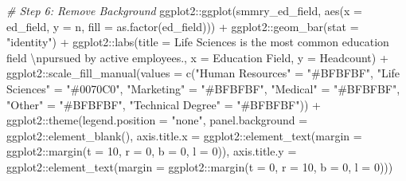 \documentclass[
]{book}
\newenvironment{Shaded}{\begin{snugshade}}{\end{snugshade}}
\newcommand{\AttributeTok}[1]{\textcolor[rgb]{0.77,0.63,0.00}{#1}}
\newcommand{\CommentTok}[1]{\textcolor[rgb]{0.56,0.35,0.01}{\textit{#1}}}
\newcommand{\DecValTok}[1]{\textcolor[rgb]{0.00,0.00,0.81}{#1}}
\newcommand{\FunctionTok}[1]{\textcolor[rgb]{0.00,0.00,0.00}{#1}}
\newcommand{\NormalTok}[1]{#1}
\newcommand{\OtherTok}[1]{\textcolor[rgb]{0.56,0.35,0.01}{#1}}
\newcommand{\SpecialCharTok}[1]{\textcolor[rgb]{0.00,0.00,0.00}{#1}}
\newcommand{\StringTok}[1]{\textcolor[rgb]{0.31,0.60,0.02}{#1}}
\begin{document}
\begin{Shaded}
\begin{Highlighting}[]
\CommentTok{\# Step 6: Remove Background}
\NormalTok{ggplot2}\SpecialCharTok{::}\FunctionTok{ggplot}\NormalTok{(smmry\_ed\_field, }\FunctionTok{aes}\NormalTok{(}\AttributeTok{x =}\NormalTok{ ed\_field, }\AttributeTok{y =}\NormalTok{ n, }\AttributeTok{fill =} \FunctionTok{as.factor}\NormalTok{(ed\_field))) }\SpecialCharTok{+}
\NormalTok{ggplot2}\SpecialCharTok{::}\FunctionTok{geom\_bar}\NormalTok{(}\AttributeTok{stat =} \StringTok{"identity"}\NormalTok{) }\SpecialCharTok{+}
\NormalTok{ggplot2}\SpecialCharTok{::}\FunctionTok{labs}\NormalTok{(}\AttributeTok{title =} \StringTok{\textquotesingle{}Life Sciences is the most common education field }\SpecialCharTok{\textbackslash{}n}\StringTok{pursued by active employees.\textquotesingle{}}\NormalTok{, }\AttributeTok{x =} \StringTok{\textquotesingle{}Education Field\textquotesingle{}}\NormalTok{, }\AttributeTok{y =} \StringTok{\textquotesingle{}Headcount\textquotesingle{}}\NormalTok{) }\SpecialCharTok{+}
\NormalTok{ggplot2}\SpecialCharTok{::}\FunctionTok{scale\_fill\_manual}\NormalTok{(}\AttributeTok{values =} \FunctionTok{c}\NormalTok{(}\StringTok{"Human Resources"} \OtherTok{=} \StringTok{"\#BFBFBF"}\NormalTok{, }
                                      \StringTok{"Life Sciences"} \OtherTok{=} \StringTok{"\#0070C0"}\NormalTok{, }
                                      \StringTok{"Marketing"} \OtherTok{=} \StringTok{"\#BFBFBF"}\NormalTok{, }
                                      \StringTok{"Medical"} \OtherTok{=} \StringTok{"\#BFBFBF"}\NormalTok{,}
                                      \StringTok{"Other"} \OtherTok{=} \StringTok{"\#BFBFBF"}\NormalTok{,}
                                      \StringTok{"Technical Degree"} \OtherTok{=} \StringTok{"\#BFBFBF"}\NormalTok{)) }\SpecialCharTok{+}
\NormalTok{ggplot2}\SpecialCharTok{::}\FunctionTok{theme}\NormalTok{(}\AttributeTok{legend.position =} \StringTok{"none"}\NormalTok{,}
               \AttributeTok{panel.background =}\NormalTok{ ggplot2}\SpecialCharTok{::}\FunctionTok{element\_blank}\NormalTok{(),}
               \AttributeTok{axis.title.x =}\NormalTok{ ggplot2}\SpecialCharTok{::}\FunctionTok{element\_text}\NormalTok{(}\AttributeTok{margin =}\NormalTok{ ggplot2}\SpecialCharTok{::}\FunctionTok{margin}\NormalTok{(}\AttributeTok{t =} \DecValTok{10}\NormalTok{, }\AttributeTok{r =} \DecValTok{0}\NormalTok{, }\AttributeTok{b =} \DecValTok{0}\NormalTok{, }\AttributeTok{l =} \DecValTok{0}\NormalTok{)),}
               \AttributeTok{axis.title.y =}\NormalTok{ ggplot2}\SpecialCharTok{::}\FunctionTok{element\_text}\NormalTok{(}\AttributeTok{margin =}\NormalTok{ ggplot2}\SpecialCharTok{::}\FunctionTok{margin}\NormalTok{(}\AttributeTok{t =} \DecValTok{0}\NormalTok{, }\AttributeTok{r =} \DecValTok{10}\NormalTok{, }\AttributeTok{b =} \DecValTok{0}\NormalTok{, }\AttributeTok{l =} \DecValTok{0}\NormalTok{)))}


\end{Highlighting}
\end{Shaded}
\end{document}
